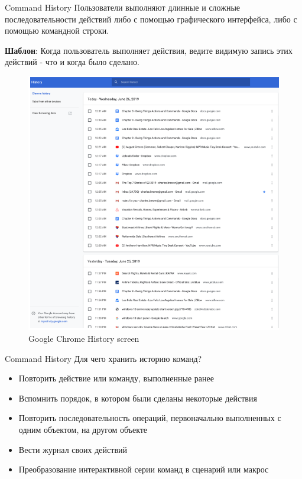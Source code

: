 \documentclass{beamer}
\begin{document}
\begin{frame}[t]{Command History}
	Пользователи выполняют длинные и сложные последовательности действий либо с помощью графического интерфейса, либо с помощью командной строки.
	
	\textbf{Шаблон}: Когда пользователь выполняет действия, ведите видимую запись этих действий - что и когда было сделано.
	\begin{figure}[h]
		\centering
		\includegraphics[scale=0.6]{images/lec08-pic25.png}
		\caption{Google Chrome History screen}
	\end{figure}
\end{frame}

\begin{frame}[t]{Command History}
	Для чего хранить историю команд?
	\begin{itemize}
		\item Повторить действие или команду, выполненные ранее
		\item Вспомнить порядок, в котором были сделаны некоторые действия
		\item Повторить последовательность операций, первоначально выполненных с одним объектом, на другом объекте
		\item Вести журнал своих действий 
		\item Преобразование интерактивной серии команд в сценарий или макрос
	\end{itemize}
\end{frame}
\end{document}
